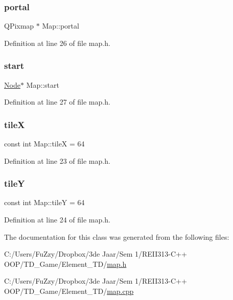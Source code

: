 \mbox{\label{class_map_a4dafaf125d6014a97e98168e41492cd5}} 
\subsubsection{\texorpdfstring{portal}{portal}}
{\footnotesize\ttfamily Q\+Pixmap $\ast$ Map\+::portal}



Definition at line 26 of file map.\+h.

\mbox{\label{class_map_aafcbf6f458eb48f4945f3d0b58d2ef85}} 
\subsubsection{\texorpdfstring{start}{start}}
{\footnotesize\ttfamily \hyperlink{class_node}{Node}$\ast$ Map\+::start}



Definition at line 27 of file map.\+h.

\mbox{\label{class_map_af2aa425dd22aba483ae973c4a15fe934}} 
\subsubsection{\texorpdfstring{tileX}{tileX}}
{\footnotesize\ttfamily const int Map\+::tileX = 64\hspace{0.3cm}{\ttfamily [static]}}



Definition at line 23 of file map.\+h.

\mbox{\label{class_map_a483dfba507cee9d2fa60a074992b1fcf}} 
\subsubsection{\texorpdfstring{tileY}{tileY}}
{\footnotesize\ttfamily const int Map\+::tileY = 64\hspace{0.3cm}{\ttfamily [static]}}



Definition at line 24 of file map.\+h.



The documentation for this class was generated from the following files\+:\begin{DoxyCompactItemize}
\item 
C\+:/\+Users/\+Fu\+Zzy/\+Dropbox/3de Jaar/\+Sem 1/\+R\+E\+I\+I313-\/\+C++ O\+O\+P/\+T\+D\+\_\+\+Game/\+Element\+\_\+\+T\+D/\hyperlink{map_8h}{map.\+h}\item 
C\+:/\+Users/\+Fu\+Zzy/\+Dropbox/3de Jaar/\+Sem 1/\+R\+E\+I\+I313-\/\+C++ O\+O\+P/\+T\+D\+\_\+\+Game/\+Element\+\_\+\+T\+D/\hyperlink{map_8cpp}{map.\+cpp}\end{DoxyCompactItemize}
